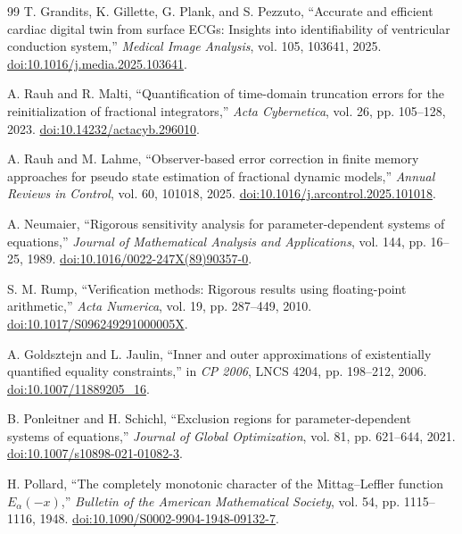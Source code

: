 \documentclass[11pt]{article}
\theoremstyle{definition}
\theoremstyle{remark}
\begin{document}
\begin{thebibliography}{99}
T. Grandits, K. Gillette, G. Plank, and S. Pezzuto,
``Accurate and efficient cardiac digital twin from surface ECGs: Insights
into identifiability of ventricular conduction system,''
\emph{Medical Image Analysis}, vol. 105, 103641, 2025.
\href{https://doi.org/10.1016/j.media.2025.103641}{doi:10.1016/j.media.2025.103641}.

A. Rauh and R. Malti,
``Quantification of time-domain truncation errors for the reinitialization of
fractional integrators,'' \emph{Acta Cybernetica}, vol. 26, pp. 105--128,
2023.
\href{https://doi.org/10.14232/actacyb.296010}{doi:10.14232/actacyb.296010}.

A. Rauh and M. Lahme,
``Observer-based error correction in finite memory approaches for pseudo
state estimation of fractional dynamic models,''
\emph{Annual Reviews in Control}, vol. 60, 101018, 2025.
\href{https://doi.org/10.1016/j.arcontrol.2025.101018}{doi:10.1016/j.arcontrol.2025.101018}.

A. Neumaier,
``Rigorous sensitivity analysis for parameter-dependent systems of
equations,'' \emph{Journal of Mathematical Analysis and Applications},
vol. 144, pp. 16--25, 1989.
\href{https://doi.org/10.1016/0022-247X(89)90357-0}{doi:10.1016/0022-247X(89)90357-0}.

S. M. Rump,
``Verification methods: Rigorous results using floating-point arithmetic,''
\emph{Acta Numerica}, vol. 19, pp. 287--449, 2010.
\href{https://doi.org/10.1017/S096249291000005X}{doi:10.1017/S096249291000005X}.

A. Goldsztejn and L. Jaulin,
``Inner and outer approximations of existentially quantified equality
constraints,'' in \emph{CP 2006}, LNCS 4204, pp. 198--212, 2006.
\href{https://doi.org/10.1007/11889205_16}{doi:10.1007/11889205\_16}.

B. Ponleitner and H. Schichl,
``Exclusion regions for parameter-dependent systems of equations,''
\emph{Journal of Global Optimization}, vol. 81, pp. 621--644, 2021.
\href{https://doi.org/10.1007/s10898-021-01082-3}{doi:10.1007/s10898-021-01082-3}.

H. Pollard,
``The completely monotonic character of the Mittag--Leffler function
$E_\alpha(-x)$,'' \emph{Bulletin of the American Mathematical Society},
vol. 54, pp. 1115--1116, 1948.
\href{https://doi.org/10.1090/S0002-9904-1948-09132-7}{doi:10.1090/S0002-9904-1948-09132-7}.


\end{thebibliography}
\end{document}
